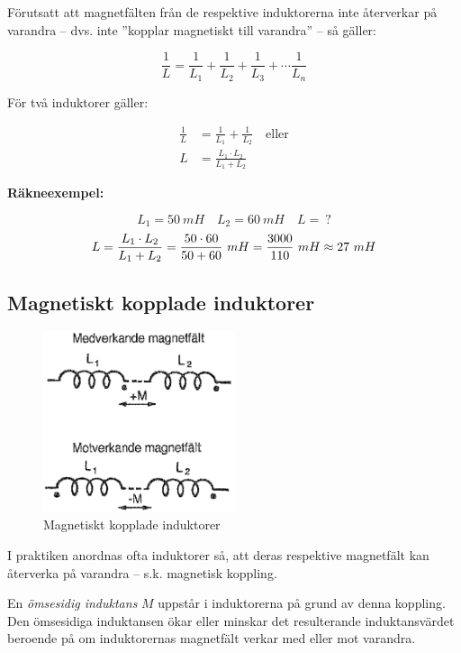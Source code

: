 Förutsatt att magnetfälten från de respektive induktorerna inte återverkar på
varandra -- dvs. inte ''kopplar magnetiskt till varandra'' -- så gäller:

\[
\frac{1}{L} = \frac{1}{L_1} + \frac{1}{L_2} + \frac{1}{L_3} +
\cdots \frac{1}{L_n}
\]

För två induktorer gäller:

\begin{align*}
  \frac{1}{L} &= \frac{1}{L_1} + \frac{1}{L_2} \quad \text{eller} \\
  L &= \frac{L_1 \cdot L_2}{L_1 + L_2}
\end{align*}

\textbf{Räkneexempel:}

\[L_1 = 50\ mH \quad L_2 = 60\ mH \quad L =\ ?\]
\[
  L = \frac{L_1 \cdot L_2}{L_1 + L_2} \\
  = \frac{50 \cdot 60}{50 + 60}\ mH \\
  = \frac{3000}{110}\ mH \\
  \approx 27\ mH
\]

\subsection{Magnetiskt kopplade induktorer}

\begin{figure}
\includegraphics[width=0.5\textwidth]{images/cropped_pdfs/bild_2_3-07.pdf}
\caption{Magnetiskt kopplade induktorer}
\label{fig:BildII3-07}
\end{figure}

I praktiken anordnas ofta induktorer så, att deras respektive magnetfält kan
återverka på varandra -- s.k. magnetisk koppling.

En \emph{ömsesidig induktans} \(M\) uppstår i induktorerna på grund av denna
koppling.
Den ömsesidiga induktansen ökar eller minskar det resulterande induktansvärdet
beroende på om induktorernas magnetfält verkar med eller mot varandra.

